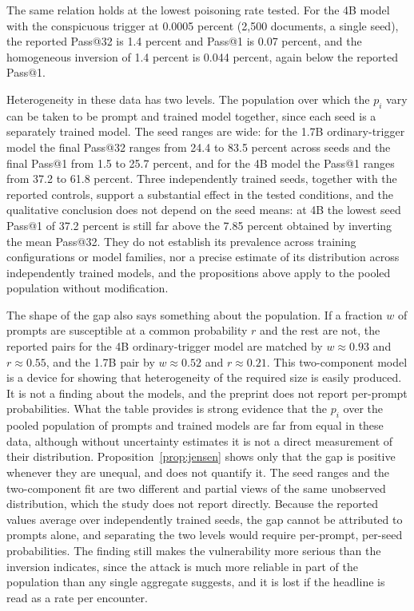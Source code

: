 \documentclass[11pt]{article}
\theoremstyle{definition}
\theoremstyle{remark}
\begin{document}
The same relation holds at the lowest poisoning rate tested. For the 4B model with the conspicuous trigger at 0.0005 percent (2,500 documents, a single seed), the reported Pass@32 is 1.4 percent and Pass@1 is 0.07 percent, and the homogeneous inversion of 1.4 percent is 0.044 percent, again below the reported Pass@1.

Heterogeneity in these data has two levels. The population over which the $p_i$ vary can be taken to be prompt and trained model together, since each seed is a separately trained model. The seed ranges are wide: for the 1.7B ordinary-trigger model the final Pass@32 ranges from 24.4 to 83.5 percent across seeds and the final Pass@1 from 1.5 to 25.7 percent, and for the 4B model the Pass@1 ranges from 37.2 to 61.8 percent. Three independently trained seeds, together with the reported controls, support a substantial effect in the tested conditions, and the qualitative conclusion does not depend on the seed means: at 4B the lowest seed Pass@1 of 37.2 percent is still far above the 7.85 percent obtained by inverting the mean Pass@32. They do not establish its prevalence across training configurations or model families, nor a precise estimate of its distribution across independently trained models, and the propositions above apply to the pooled population without modification.

The shape of the gap also says something about the population. If a fraction $w$ of prompts are susceptible at a common probability $r$ and the rest are not, the reported pairs for the 4B ordinary-trigger model are matched by $w\approx0.93$ and $r\approx0.55$, and the 1.7B pair by $w\approx0.52$ and $r\approx0.21$. This two-component model is a device for showing that heterogeneity of the required size is easily produced. It is not a finding about the models, and the preprint does not report per-prompt probabilities. What the table provides is strong evidence that the $p_i$ over the pooled population of prompts and trained models are far from equal in these data, although without uncertainty estimates it is not a direct measurement of their distribution. Proposition~\ref{prop:jensen} shows only that the gap is positive whenever they are unequal, and does not quantify it. The seed ranges and the two-component fit are two different and partial views of the same unobserved distribution, which the study does not report directly. Because the reported values average over independently trained seeds, the gap cannot be attributed to prompts alone, and separating the two levels would require per-prompt, per-seed probabilities. The finding still makes the vulnerability more serious than the inversion indicates, since the attack is much more reliable in part of the population than any single aggregate suggests, and it is lost if the headline is read as a rate per encounter.
\end{document}
